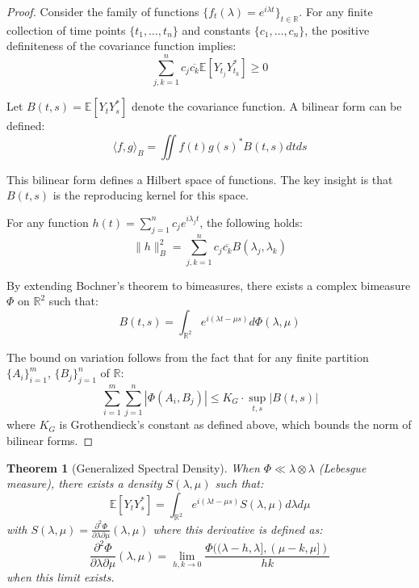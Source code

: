 \documentclass{article}
\theoremstyle{plain}
\newtheorem{theorem}{Theorem}
\theoremstyle{definition}
\begin{document}
\begin{proof}
Consider the family of functions $\{f_t(\lambda) = e^{i\lambda t}\}_{t \in \mathbb{R}}$. For any finite collection of time points $\{t_1, \ldots, t_n\}$ and constants $\{c_1, \ldots, c_n\}$, the positive definiteness of the covariance function implies:
\begin{equation}
\sum_{j,k=1}^n c_j \overline{c_k} \mathbb{E}[Y_{t_j} Y_{t_k}^*] \geq 0
\end{equation}

Let $B(t,s) = \mathbb{E}[Y_t Y_s^*]$ denote the covariance function. A bilinear form can be defined:
\begin{equation}
\langle f, g \rangle_B = \iint f(t)g(s)^* B(t,s) dt ds
\end{equation}

This bilinear form defines a Hilbert space of functions. The key insight is that $B(t,s)$ is the reproducing kernel for this space.

For any function $h(t) = \sum_{j=1}^n c_j e^{i\lambda_j t}$, the following holds:
\begin{equation}
\|h\|_B^2 = \sum_{j,k=1}^n c_j \overline{c_k} B(\lambda_j, \lambda_k)
\end{equation}

By extending Bochner's theorem to bimeasures, there exists a complex bimeasure $\Phi$ on $\mathbb{R}^2$ such that:
\begin{equation}
B(t,s) = \int_{\mathbb{R}^2} e^{i(\lambda t-\mu s)} d\Phi(\lambda,\mu)
\end{equation}

The bound on variation follows from the fact that for any finite partition $\{A_i\}_{i=1}^m$, $\{B_j\}_{j=1}^n$ of $\mathbb{R}$:
\begin{equation}
\sum_{i=1}^m\sum_{j=1}^n |\Phi(A_i, B_j)| \leq K_G \cdot \sup_{t,s} |B(t,s)|
\end{equation}
where $K_G$ is Grothendieck's constant as defined above, which bounds the norm of bilinear forms.
\end{proof}

\begin{theorem}[Generalized Spectral Density]
When $\Phi \ll \lambda\otimes \lambda$ (Lebesgue measure), there exists a density $S(\lambda,\mu)$ such that:
\begin{equation}
\mathbb{E}[Y_t Y_s^*] = \int_{\mathbb{R}^2} e^{i(\lambda t - \mu s)} S(\lambda,\mu) d\lambda d\mu
\end{equation}
with $S(\lambda,\mu) = \frac{\partial^2 \Phi}{\partial \lambda \partial \mu}(\lambda,\mu)$ where this derivative is defined as:
\begin{equation}
\frac{\partial^2 \Phi}{\partial \lambda \partial \mu}(\lambda,\mu) = \lim_{h,k \to 0} \frac{\Phi((\lambda-h, \lambda], (\mu-k, \mu])}{hk}
\end{equation}
when this limit exists.
\end{theorem}
\end{document}
